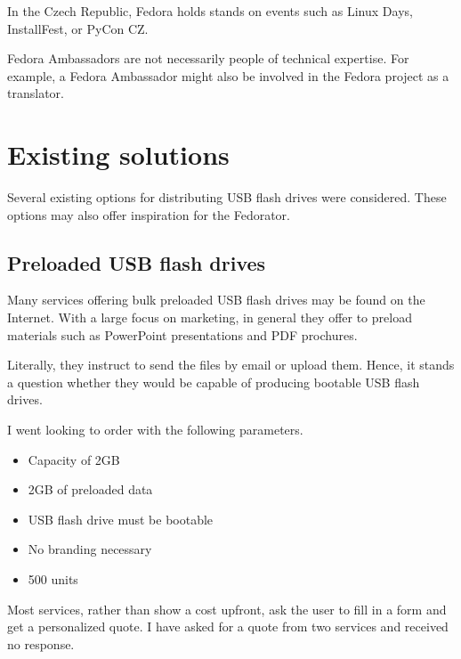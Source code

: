         In the Czech Republic, Fedora holds stands on events such as Linux Days\cite{linux-days}, InstallFest\cite{install-fest}, or PyCon CZ\cite{pycon-cz}.
        
        Fedora Ambassadors are not necessarily people of technical expertise.  For example, a Fedora Ambassador might also be involved in the Fedora project as a translator.
    \section{Existing solutions}
        Several existing options for distributing USB flash drives were considered.  These options may also offer inspiration for the Fedorator.
        
        \subsection{Preloaded USB flash drives}
            Many services offering bulk preloaded USB flash drives may be found on the Internet.  With a large focus on marketing, in general they offer to preload materials such as PowerPoint presentations and PDF prochures\cite{flashbay-data-preloading}.
            
            Literally, they instruct to send the files by email or upload them.  Hence, it stands a question whether they would be capable of producing bootable USB flash drives.
            
            I went looking to order with the following parameters.
            \begin{itemize}
                \item Capacity of 2GB
                \item 2GB of preloaded data
                \item USB flash drive must be bootable
                \item No branding necessary
                \item 500 units
            \end{itemize}
            
            Most services, rather than show a cost upfront, ask the user to fill in a form and get a personalized quote.  I have asked for a quote from two services and received no response.
            
        
